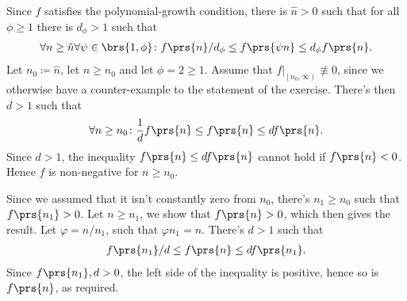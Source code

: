 \documentclass[oneside]{scrbook}
\theoremstyle{definition}
\begin{document}
\begin{exercise}
Since $f$ satisfies the polynomial-growth condition, there is $\hat{n} > 0$ such that for all $\phi \geq 1$ there is $d_{\phi} > 1$ such that
\begin{align*}
\forall n \geq \hat{n} \forall \psi \in \brs{1,\phi} \colon f\prs{n} / d_\phi \leq f\prs{\psi n} \leq d_\phi f\prs{n} \text{.}
\end{align*}
Let $n_0 \coloneqq \hat{n}$, let $n \geq n_0$ and let $\phi = 2 \geq 1$. Assume that $\left. f \right|_{\left[n_0, \infty \right)} \not\equiv 0$, since we otherwise have a counter-example to the statement of the exercise.
There's then $d > 1$ such that
\begin{align*}
\forall n \geq n_0 \colon \frac{1}{d} f\prs{n} \leq f\prs{n} \leq d f\prs{n} \text{.} 
\end{align*}
Since $d > 1$, the inequality $f\prs{n} \leq d f\prs{n}$ cannot hold if $f\prs{n} < 0$. Hence $f$ is non-negative for $n \geq n_0$.

Since we assumed that it isn't constantly zero from $n_0$, there's $n_1 \geq n_0$ such that $f\prs{n_1} > 0$. Let $n \geq n_1$, we show that $f\prs{n} > 0$, which then gives the result.
Let $\varphi = n/n_1$, such that $\varphi n_1 = n$. There's $d > 1$ such that
\begin{align*}
f\prs{n_1} / d \leq f\prs{n} \leq d f\prs{n_1} \text{.}
\end{align*}
Since $f\prs{n_1}, d > 0$, the left side of the inequality is positive, hence so is $f\prs{n}$, as required.
\end{exercise}

\begin{exercise}
\end{exercise}
\end{document}

